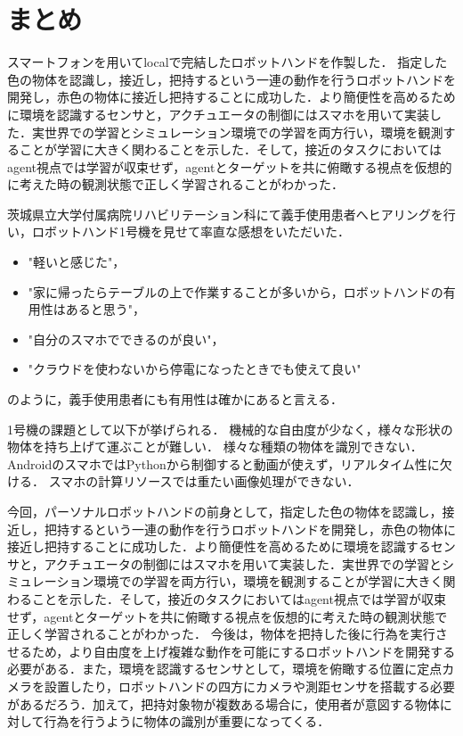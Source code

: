 \section{まとめ}
スマートフォンを用いてlocalで完結したロボットハンドを作製した．
指定した色の物体を認識し，接近し，把持するという一連の動作を行うロボットハンドを開発し，赤色の物体に接近し把持することに成功した．より簡便性を高めるために環境を認識するセンサと，アクチュエータの制御にはスマホを用いて実装した．実世界での学習とシミュレーション環境での学習を両方行い，環境を観測することが学習に大きく関わることを示した．そして，接近のタスクにおいてはagent視点では学習が収束せず，agentとターゲットを共に俯瞰する視点を仮想的に考えた時の観測状態で正しく学習されることがわかった．

茨城県立大学付属病院リハビリテーション科にて義手使用患者へヒアリングを行い，ロボットハンド1号機を見せて率直な感想をいただいた．
\begin{itemize}
    \item "軽いと感じた"，
    \item "家に帰ったらテーブルの上で作業することが多いから，ロボットハンドの有用性はあると思う"，
    \item "自分のスマホでできるのが良い"，
    \item "クラウドを使わないから停電になったときでも使えて良い"
\end{itemize}
のように，義手使用患者にも有用性は確かにあると言える．

1号機の課題として以下が挙げられる．
機械的な自由度が少なく，様々な形状の物体を持ち上げて運ぶことが難しい．
様々な種類の物体を識別できない．
AndroidのスマホではPythonから制御すると動画が使えず，リアルタイム性に欠ける．
スマホの計算リソースでは重たい画像処理ができない．



今回，パーソナルロボットハンドの前身として，指定した色の物体を認識し，接近し，把持するという一連の動作を行うロボットハンドを開発し，赤色の物体に接近し把持することに成功した．より簡便性を高めるために環境を認識するセンサと，アクチュエータの制御にはスマホを用いて実装した．実世界での学習とシミュレーション環境での学習を両方行い，環境を観測することが学習に大きく関わることを示した．そして，接近のタスクにおいてはagent視点では学習が収束せず，agentとターゲットを共に俯瞰する視点を仮想的に考えた時の観測状態で正しく学習されることがわかった．
今後は，物体を把持した後に行為を実行させるため，より自由度を上げ複雑な動作を可能にするロボットハンドを開発する必要がある．また，環境を認識するセンサとして，環境を俯瞰する位置に定点カメラを設置したり，ロボットハンドの四方にカメラや測距センサを搭載する必要があるだろう．加えて，把持対象物が複数ある場合に，使用者が意図する物体に対して行為を行うように物体の識別が重要になってくる．



